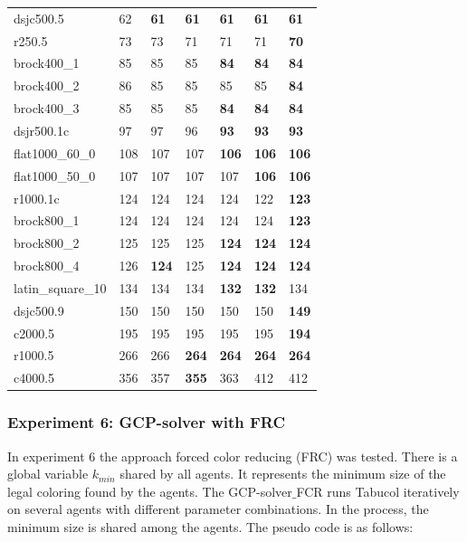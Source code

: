 \documentclass[12pt,a4paper,twoside]{scrartcl}
\numberwithin{equation}{section}
\begin{document}
\begin{table}[H]
\begin{center}
\begin{tabular}{| l | l l l l l p{1cm}|}
dsjc500.5&62&\textbf{61}&\textbf{61}&\textbf{61}&\textbf{61}&\textbf{61}  \\
r250.5&73&73&71&71&71&\textbf{70}  \\ \hline
brock400\_1&85&85&85&\textbf{84}&\textbf{84}&\textbf{84}  \\
brock400\_2&86&85&85&85&85&\textbf{84}  \\ 
brock400\_3&85&85&85&\textbf{84}&\textbf{84}&\textbf{84}  \\ 
dsjr500.1c&97&97&96&\textbf{93}&\textbf{93}&\textbf{93}  \\ 
flat1000\_60\_0&108&107&107&\textbf{106}&\textbf{106}&\textbf{106}  \\ \hline
flat1000\_50\_0&107&107&107&107&\textbf{106}&\textbf{106}  \\ 
r1000.1c&124&124&124&124&122&\textbf{123}  \\ 
brock800\_1&124&124&124&124&124&\textbf{123}  \\
brock800\_2&125&125&125&\textbf{124}&\textbf{124}&\textbf{124}  \\
brock800\_4&126&\textbf{124}&125&\textbf{124}&\textbf{124}&\textbf{124}  \\ \hline
latin\_square\_10&134&134&134&\textbf{132}&\textbf{132}&134  \\
dsjc500.9&150&150&150&150&150&\textbf{149}  \\
c2000.5&195&195&195&195&195&\textbf{194}  \\ 
r1000.5&266&266&\textbf{264}&\textbf{264}&\textbf{264}&\textbf{264}  \\ 
c4000.5&356&357&\textbf{355}&363&412&412  \\ \hline
    \end{tabular}
\label{table:basic parallel GCP-solver}
\end{center}
\end{table}
\subsubsection{Experiment 6: GCP-solver with FRC}
\label{sec:Experiment 6}
In experiment 6 the approach forced color reducing (FRC) was tested.
There is a global variable $k_{min}$ shared by all agents. It represents the minimum size of the legal coloring found by the agents.
The GCP-solver$\_$FCR runs Tabucol iteratively on several agents with different parameter combinations. In the process, the minimum size is shared among the agents.
\vspace{40px} 
The pseudo code is as follows:
\end{document}
